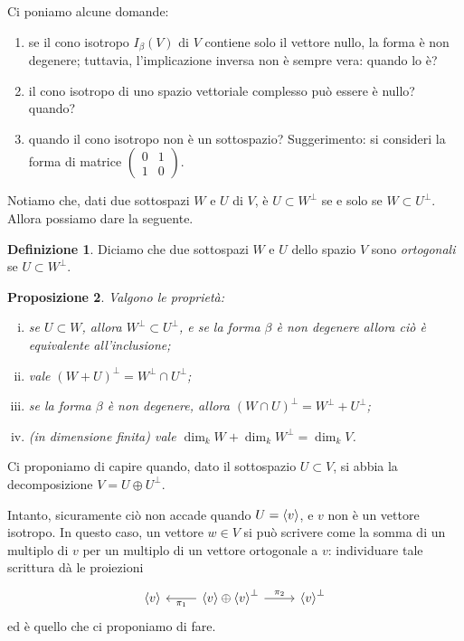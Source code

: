 \documentclass[a4paper]{amsproc}
\theoremstyle{plain}
\newtheorem{prp}{Proposizione}[section]
\theoremstyle{definition}
\newtheorem{dfn}[prp]{Definizione}
\theoremstyle{remark}
\DeclarePairedDelimiter{\cl}{\langle}{\rangle}
\begin{document}
Ci poniamo alcune domande:
\begin{enumerate}
\item se il cono isotropo $ I_\beta(V) $ di $ V $ contiene solo il vettore nullo, la forma è non degenere; tuttavia, l'implicazione inversa non è sempre vera: quando lo è?
\item il cono isotropo di uno spazio vettoriale complesso può essere è nullo? quando?
\item quando il cono isotropo non è un sottospazio? Suggerimento: si consideri la forma di matrice $ \left(
    \begin{smallmatrix}
      0 & 1\\
      1 & 0
    \end{smallmatrix}
\right) $.
\end{enumerate}


Notiamo che, dati due sottospazi $ W $ e $ U $ di $ V $, è $ U\subset W^\perp  $ se e solo se $ W\subset U^\perp $. Allora possiamo dare la seguente.

\begin{dfn}
  Diciamo che due sottospazi $ W $ e $ U $ dello spazio $ V $ sono \emph{ortogonali} se $ U\subset W^\perp $.
\end{dfn}

\begin{prp}
  Valgono le proprietà:
  \begin{enumerate}[(i)]
  \item se $ U\subset W $, allora $ W^\perp\subset U^\perp $, e se la forma $ \beta $ è non degenere allora ciò è equivalente all'inclusione;
  \item vale $ (W + U)^\perp = W^\perp\cap U^\perp $;
  \item se la forma $ \beta $ è non degenere, allora $ (W\cap U)^\perp = W^\perp + U^\perp $;
  \item (in dimensione finita) vale $ \dim_kW + \dim_kW^\perp = \dim_kV $.
  \end{enumerate}
\end{prp}

Ci proponiamo di capire quando, dato il sottospazio $ U\subset V $, si abbia la decomposizione $ V = U\oplus U^\perp $.

Intanto, sicuramente ciò non accade quando $ U = \cl v $, e $ v $ non è un vettore isotropo. In questo caso, un vettore $ w\in V $ si può scrivere come la somma di un multiplo di $ v $ per un multiplo di un vettore ortogonale a $ v $: individuare tale scrittura dà le proiezioni
\[
  \begin{tikzcd}
    \cl v & {\cl v\oplus{\cl v}^\perp}\ar[l, "\pi_1"]\ar[r, "\pi_2"] & {\cl v}^\perp
  \end{tikzcd}
\]
ed è quello che ci proponiamo di fare.
\end{document}
